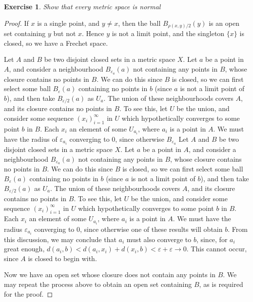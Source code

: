 \documentclass{report}
\theoremstyle{plain}
\newtheorem{exercise}{Exercise}[section]
\theoremstyle{definition}
\begin{document}
\begin{exercise}
    Show that every metric space is normal
\end{exercise}
\begin{proof}
    If $x$ is a single point, and $y \neq x$, then the ball $B_{\rho(x,y)/2}(y)$ is an open set containing $y$ but not $x$. Hence $y$ is not a limit point, and the singleton $\{x\}$ is closed, so we have a Frechet space.

    Let $A$ and $B$ be two disjoint closed sets in a metric space $X$. Let $a$ be a point in $A$, and consider a neighbourhood $B_{\varepsilon_a}(a)$ not containing any points in $B$, whose closure contains no points in $B$. We can do this since $B$ is closed, so we can first select some ball $B_\varepsilon(a)$ containing no points in $b$ (since $a$ is not a limit point of $b$), and then take $B_{\varepsilon/2}(a)$ as $U_a$. The union of these neighbourhoods covers $A$, and its closure contains no points in $B$. To see this, let $U$ be the union, and consider some sequence $(x_i)_{i = 1}^\infty$ in $U$ which hypothetically converges to some point $b$ in $B$. Each $x_i$ an element of some $U_{a_i}$, where $a_i$ is a point in $A$. We must have the radius of $\varepsilon_{a_i}$ converging to 0, since otherwise $B_{\varepsilon_a}$
    Let $A$ and $B$ be two disjoint closed sets in a metric space $X$. Let $a$ be a point in $A$, and consider a neighbourhood $B_{\varepsilon_a}(a)$ not containing any points in $B$, whose closure contains no points in $B$. We can do this since $B$ is closed, so we can first select some ball $B_\varepsilon(a)$ containing no points in $b$ (since $a$ is not a limit point of $b$), and then take $B_{\varepsilon/2}(a)$ as $U_a$. The union of these neighbourhoods covers $A$, and its closure contains no points in $B$. To see this, let $U$ be the union, and consider some sequence $(x_i)_{i = 1}^\infty$ in $U$ which hypothetically converges to some point $b$ in $B$. Each $x_i$ an element of some $U_{a_i}$, where $a_i$ is a point in $A$. We must have the radius $\varepsilon_{a_i}$ converging to 0, since otherwise one of these results will obtain $b$. From this discussion, we may conclude that $a_i$ must also converge to $b$, since, for $a_i$ great enough, $d(a_i,b) < d(a_i,x_i) + d(x_i,b) < \varepsilon + \varepsilon \to 0$. This cannot occur, since $A$ is closed to begin with.

    Now we have an open set whose closure does not contain any points in $B$. We may repeat the process above to obtain an open set containing $B$, as is required for the proof.
\end{proof}
\end{document}
